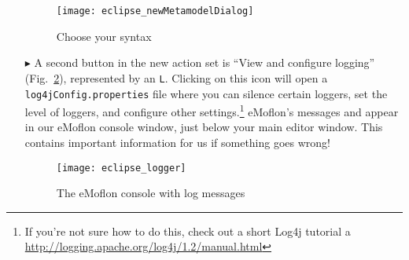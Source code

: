 \begin{itemize}
\begin{figure}[htbp]
	\centering
  \texttt{[image: eclipse\_newMetamodelDialog]}
	\caption{Choose your syntax}
	\label{fig_chooseSyntax}
\end{figure} 

\item[$\blacktriangleright$]  A second button in the new action set is ``View and configure logging'' (Fig.~\ref{fig_logger}), represented by an \texttt{L}.
Clicking on this icon will open a \texttt{log4jConfig.properties} file where you can silence certain loggers, set the level of loggers, and configure other
settings.\footnote{If you're not sure how to do this, check out a short Log4j tutorial a
\href{http://logging.apache.org/log4j/1.2/manual.html}{http://logging.apache.org/log4j/1.2/manual.html}} eMoflon's messages and appear in our eMoflon console
window, just below your main editor window. This contains important information for us if something goes wrong!

\newpage
\vspace*{3cm}
\begin{figure}[htbp]
	\centering
  \texttt{[image: eclipse\_logger]}
	\caption{The eMoflon console with log messages}
	\label{fig_logger}
\end{figure} 
\end{itemize}





